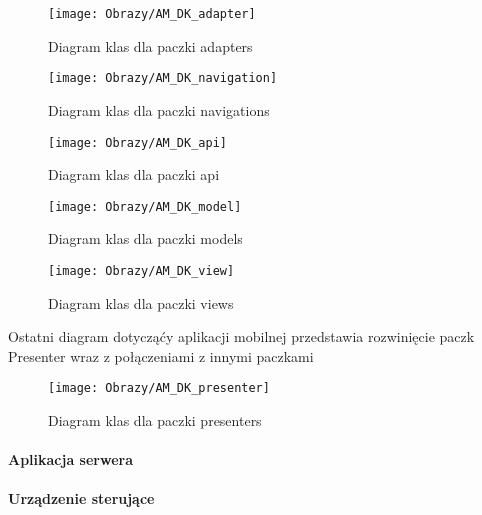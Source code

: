 		\begin{figure}[ht!]
		\centering
		\texttt{[image: Obrazy/AM\_DK\_adapter]}
		\caption{Diagram klas dla paczki adapters}
		\label{Diagram klas dla paczki adapters}
	\end{figure}


	
		\begin{figure}[ht!]
		\centering
		\texttt{[image: Obrazy/AM\_DK\_navigation]}
		\caption{Diagram klas dla paczki navigations}
		\label{Diagram klas dla paczki navigations}
	\end{figure}

	
	
	
	
	\begin{figure}[ht!]
		\centering
		\texttt{[image: Obrazy/AM\_DK\_api]}
		\caption{Diagram klas dla paczki api}
		\label{Diagram klas dla paczki api}
	\end{figure}

	

	\begin{figure}[ht!]
		\centering
		\texttt{[image: Obrazy/AM\_DK\_model]}
		\caption{Diagram klas dla paczki models}
		\label{Diagram klas dla paczki models}
	\end{figure}

	
\begin{figure}[ht!]
	\centering
	\texttt{[image: Obrazy/AM\_DK\_view]}
	\caption{Diagram klas dla paczki views}
	\label{Diagram klas dla paczki views}
\end{figure}

		
			Ostatni diagram dotycząćy aplikacji mobilnej przedstawia rozwinięcie paczk Presenter wraz z połączeniami z innymi paczkami
		\begin{figure}[ht!]
			\centering
			\texttt{[image: Obrazy/AM\_DK\_presenter]}
			\caption{Diagram klas dla paczki presenters}
			\label{Diagram klas dla paczki presenters}
		\end{figure}
		
		\newpage
		\paragraph{Aplikacja serwera}
		\paragraph{Urządzenie sterujące}
